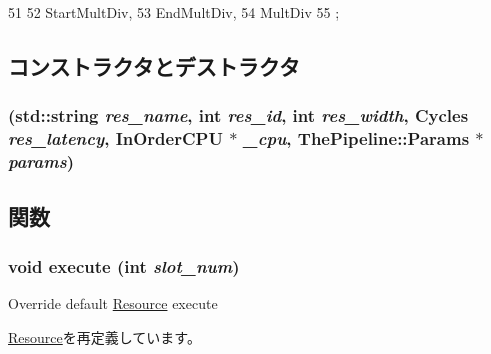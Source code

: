 \begin{DoxyCode}
51                  {
52         StartMultDiv,
53         EndMultDiv,
54         MultDiv
55     };
\end{DoxyCode}


\subsection{コンストラクタとデストラクタ}
\hypertarget{classMultDivUnit_ac2e7df1e1f0836087d602c5018b3dbb1}{
\subsubsection[{MultDivUnit}]{ (std::string {\em res\_\-name}, \/  int {\em res\_\-id}, \/  int {\em res\_\-width}, \/  {\bf Cycles} {\em res\_\-latency}, \/  {\bf InOrderCPU} $\ast$ {\em \_\-cpu}, \/  {\bf ThePipeline::Params} $\ast$ {\em params})}}
\label{classMultDivUnit_ac2e7df1e1f0836087d602c5018b3dbb1}


\subsection{関数}
\hypertarget{classMultDivUnit_a7b7fff82f8c9cbdb02add1346f60bb9e}{
\subsubsection[{execute}]{\setlength{\rightskip}{0pt plus 5cm}void execute (int {\em slot\_\-num})}}
\label{classMultDivUnit_a7b7fff82f8c9cbdb02add1346f60bb9e}
Override default \hyperlink{classResource}{Resource} execute 

\hyperlink{classResource_a39af49c5568d1db3f53c12d7d6914c32}{Resource}を再定義しています。


